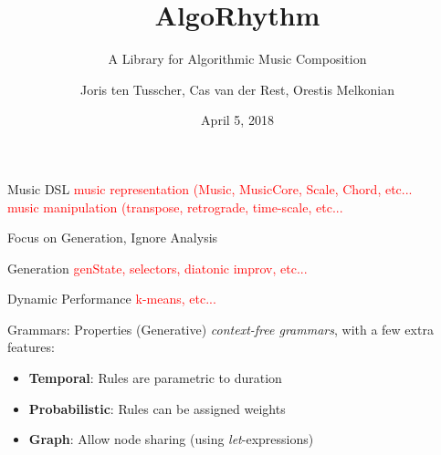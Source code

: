 \documentclass{beamer}
\title{AlgoRhythm}
\subtitle{A Library for Algorithmic Music Composition}
\author{Joris ten Tusscher, Cas van der Rest, Orestis Melkonian}
\date{April 5, 2018}
\institute{Universiteit Utrecht}
\newcommand\todo[1]{\textcolor{red}{#1}}
\begin{document}
	\maketitle
	
	\begin{frame}{Music DSL}
	\todo{music representation (Music, MusicCore, Scale, Chord, etc...}\\
	\todo{music manipulation (transpose, retrograde, time-scale, etc...}\\
	\end{frame}
		
	{
	\begin{frame}{Focus on Generation, Ignore Analysis}
	\end{frame}
	}	
	
	\begin{frame}{Generation}
	\todo{genState, selectors, diatonic improv, etc...}
	\end{frame}
	
	\begin{frame}{Dynamic Performance}
	\todo{k-means, etc...}
	\end{frame}
	
	\begin{frame}[fragile=singleslide]{Grammars: Properties}
    (Generative) \textit{context-free grammars}, with a few extra features:
	\begin{itemize}
	\item \textbf{Temporal}: Rules are parametric to duration
	\item \textbf{Probabilistic}: Rules can be assigned weights
	\item \textbf{Graph}: Allow node sharing (using \textit{let}-expressions)
	\end{itemize}
	\end{frame}
	
\end{document}
